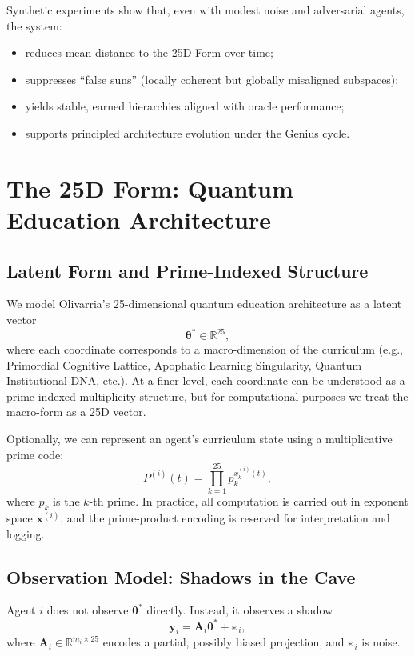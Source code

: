 \documentclass[11pt]{article}
\begin{document}
Synthetic experiments show that, even with modest noise and adversarial
agents, the system:
\begin{itemize}[noitemsep]
  \item reduces mean distance to the 25D Form over time;
  \item suppresses ``false suns'' (locally coherent but globally
        misaligned subspaces);
  \item yields stable, earned hierarchies aligned with oracle performance;
  \item supports principled architecture evolution under the Genius cycle.
\end{itemize}

\section{The 25D Form: Quantum Education Architecture}

\subsection{Latent Form and Prime-Indexed Structure}

We model Olivarria's 25-dimensional quantum education architecture as
a latent vector
\[
  \bm{\theta}^* \in \mathbb{R}^{25},
\]
where each coordinate corresponds to a macro-dimension of the
curriculum (e.g., Primordial Cognitive Lattice, Apophatic Learning
Singularity, Quantum Institutional DNA, etc.).
At a finer level, each coordinate can be understood as a
prime-indexed multiplicity structure, but for computational purposes
we treat the macro-form as a 25D vector.

Optionally, we can represent an agent's curriculum state using a
multiplicative prime code:
\[
  P^{(i)}(t) = \prod_{k=1}^{25} p_k^{x^{(i)}_k(t)},
\]
where $p_k$ is the $k$-th prime.
In practice, all computation is carried out in exponent space
$\bm{x}^{(i)}$, and the prime-product encoding is reserved for
interpretation and logging.

\subsection{Observation Model: Shadows in the Cave}

Agent $i$ does not observe $\bm{\theta}^*$ directly.
Instead, it observes a shadow
\[
  \bm{y}_i = \bm{A}_i \bm{\theta}^* + \bm{\varepsilon}_i,
\]
where $\bm{A}_i \in \mathbb{R}^{m_i \times 25}$ encodes a partial,
possibly biased projection, and $\bm{\varepsilon}_i$ is noise.
\end{document}
